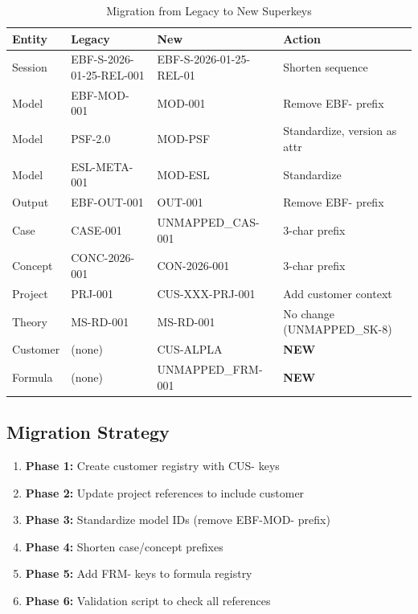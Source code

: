 \begin{table}[htbp]
\centering
\caption{Migration from Legacy to New Superkeys}
\label{tab:superkey-migration}
\renewcommand{\arraystretch}{1.3}
\begin{tabular}{@{}llll@{}}
\toprule
\textbf{Entity} & \textbf{Legacy} & \textbf{New} & \textbf{Action} \\
\midrule
Session & EBF-S-2026-01-25-REL-001 & EBF-S-2026-01-25-REL-01 & Shorten sequence \\
Model & EBF-MOD-001 & MOD-001 & Remove EBF- prefix \\
Model & PSF-2.0 & MOD-PSF & Standardize, version as attr \\
Model & ESL-META-001 & MOD-ESL & Standardize \\
Output & EBF-OUT-001 & OUT-001 & Remove EBF- prefix \\
Case & CASE-001 & UNMAPPED_CAS-001 & 3-char prefix \\
Concept & CONC-2026-001 & CON-2026-001 & 3-char prefix \\
Project & PRJ-001 & CUS-XXX-PRJ-001 & Add customer context \\
Theory & MS-RD-001 & MS-RD-001 & No change (UNMAPPED_SK-8) \\
Customer & (none) & CUS-ALPLA & \textbf{NEW} \\
Formula & (none) & UNMAPPED_FRM-001 & \textbf{NEW} \\
\bottomrule
\end{tabular}
\end{table}

\subsection{Migration Strategy}

\begin{enumerate}
    \item \textbf{Phase 1:} Create customer registry with CUS- keys
    \item \textbf{Phase 2:} Update project references to include customer
    \item \textbf{Phase 3:} Standardize model IDs (remove EBF-MOD- prefix)
    \item \textbf{Phase 4:} Shorten case/concept prefixes
    \item \textbf{Phase 5:} Add FRM- keys to formula registry
    \item \textbf{Phase 6:} Validation script to check all references
\end{enumerate}


